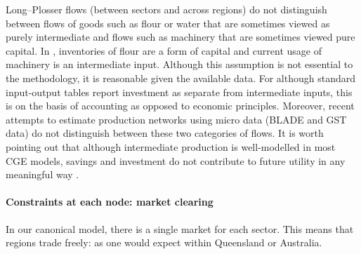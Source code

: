 \documentclass[12pt,a4paper,twoside, draft]{article}
\begin{document}
Long--Plosser flows (between sectors and across regions) do not distinguish
between flows of goods such as flour or water that are sometimes viewed as
purely intermediate and flows such as machinery that are sometimes viewed pure
capital.
In \citet{Long_Plosser-Real_business_cycles}, inventories of flour are a form
of capital and current usage of machinery is an intermediate input.
Although this assumption is not essential to the methodology, it is reasonable
given the available data.
For although standard input-output tables report investment as separate from
intermediate inputs, this is on the basis of accounting as opposed to economic
principles.
Moreover, recent attempts \citep{Elazaar_Raymond-Network} to estimate
production networks using micro data (BLADE and GST data) do not distinguish
between these two categories of flows.
It is worth pointing out that although intermediate production is well-modelled
in most CGE models, savings and investment do not contribute to future 
utility in any meaningful way \citep{Hosoe_et_al-CGE_textbook}.

\paragraph{Constraints at each node: market clearing}
In our canonical model, there is a single market for each sector.
This means that regions trade freely: as one would expect within Queensland or
Australia.
\end{document}
